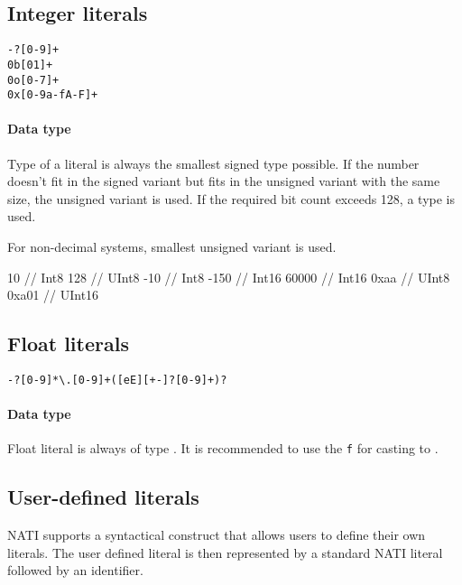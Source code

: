 \subsection{Integer literals}
\begin{grammar}
	 \verb|-?[0-9]+| \\
	 \verb|0b[01]+| \\
	 \verb|0o[0-7]+| \\
	 \verb|0x[0-9a-fA-F]+|
\end{grammar}

\paragraph{Data type} Type of a literal is always the smallest signed type possible. If the number doesn't fit in the signed variant but fits in the unsigned variant with the same size, the unsigned variant is used. If the required bit count exceeds 128, a  type is used.

For non-decimal systems, smallest unsigned variant is used.

\begin{code}
10 // Int8
128 // UInt8
-10 // Int8
-150 // Int16
60000 // Int16
0xaa // UInt8
0xa01 // UInt16
\end{code}

\subsection{Float literals}
\begin{grammar}
	 \verb|-?[0-9]*\.[0-9]+([eE][+-]?[0-9]+)?|
\end{grammar}

\paragraph{Data type} Float literal is always of type . It is recommended to use the \verb|f| for casting to .

\subsection{User-defined literals} \label{userDefinedLiterals}
NATI supports a syntactical construct that allows users to define their own literals. The user defined literal is then represented by a standard NATI literal followed by an identifier.


